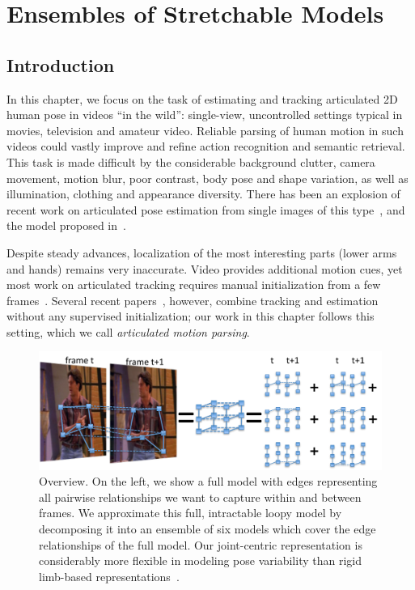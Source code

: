\chapter{Ensembles of Stretchable Models} \label{sec:stretchable}
\section{Introduction}


In this chapter, we focus on the task of estimating and tracking articulated 2D 
human pose in videos ``in the wild'': single-view, uncontrolled settings 
typical in movies, television and amateur video.   Reliable
parsing of human motion in such videos could vastly improve and refine action 
recognition and semantic retrieval. This task is made difficult by the 
considerable background clutter, camera movement, motion blur, poor contrast, 
body pose and shape variation, as well as illumination, clothing and appearance 
diversity. There has been an explosion of recent work on articulated pose 
estimation from single images of this type~\citep{ronfard02, 
miko04,felz05,ramanan06,ferrari08,eichner09, andriluka09}, and the model 
proposed in~.  

Despite steady advances, localization of the most interesting parts (lower arms 
and hands) remains very inaccurate.  Video provides additional motion cues, yet 
most work on articulated tracking requires manual initialization from a few
frames~\cite{cardboard02,bregler98,balan06,sminchisescu03,ren07,buehler08}.  
Several recent papers~\cite{sigal04, lan05,ramanan05,ferrari08,weisssapp10}, 
however, combine tracking and estimation without any supervised initialization; 
our work in this chapter follows this setting, which we call {\em articulated 
motion parsing}.

\begin{figure}[t!]
\centering
\includegraphics[width=0.99\linewidth]{figs/stretchable-overview.pdf}
\caption[Stretchable Ensembles overview]{\label{fig:overview} Overview.  On the 
left, we show a full model with edges representing all pairwise relationships 
we want to capture within and between frames.  We approximate this full, 
intractable loopy model by decomposing it into an ensemble of six models which 
cover the edge relationships of the full model.  Our joint-centric 
representation is considerably more flexible in modeling pose variability than 
rigid limb-based 
representations~\cite{ferrari08,sapp2010cascades,andriluka09}.}
\label{fig:stretchable-overview}
\end{figure}

